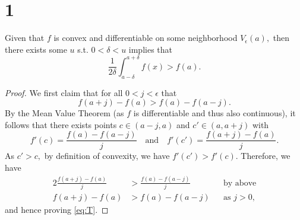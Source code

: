\documentclass[10pt]{article}
\begin{document}
\section*{1}

Given that $f$ is convex and differentiable on some neighborhood $V_\epsilon(a),$ then there exists some $u$ s.t. $0<\delta<u$ implies that
\[\frac{1}{2\delta}\int_{a-\delta}^{a+\delta}f(x) > f(a).\]
\begin{proof}

    We first claim that for all $0<j<\epsilon$ that %
    \begin{equation} \label{eq:T}
        f(a+j)-f(a)>f(a)-f(a-j).
    \end{equation}
    By the Mean Value Theorem (as $f$ is differentiable and thus also continuous), it follows that there exists points $c\in(a-j,a)$ and $c'\in(a,a+j)$ with 
    \[f'(c) = \frac{f(a)-f(a-j)}{j} \quad\text{and}\quad f'(c') =\frac{f(a+j)-f(a)}{j}.\]
    As $c'>c,$ by definition of convexity, we have $f'(c')> f'(c)$. Therefore, we have
    \begin{alignat*}{2}
        \frac{f(a+j)-f(a)}{j}&>\frac{f(a)-f(a-j)}{j} \qquad&& \text{by above}\\
        f(a+j)-f(a) &> f(a)-f(a-j) &&\text{as $j>0,$}
    \end{alignat*}
    and hence proving \eqref{eq:T}.


\end{proof}
\end{document}
